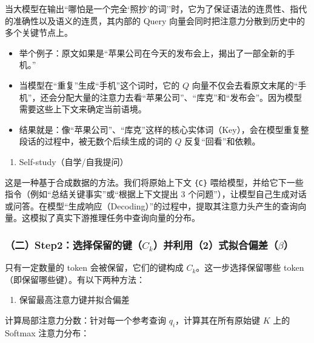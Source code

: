 当大模型在输出``哪怕是一个完全`照抄'的词''时，它为了保证语法的连贯性、指代的准确性以及语义的连贯，其内部的 Query 向量会同时把注意力分散到历史中的多个关键节点上。

\begin{itemize}
\tightlist
\item
  举个例子：原文如果是``苹果公司在今天的发布会上，揭出了一部全新的手机。''
\item
  当模型在``重复''生成``手机''这个词时，它的 \(Q\) 向量不仅会去看原文末尾的``手机''，还会分配大量的注意力去看``苹果公司''、``库克''和``发布会''。因为模型需要这些上下文来确定当前语境。
\item
  结果就是：像``苹果公司''、``库克''这样的核心实体词（Key），会在模型重复整段话的过程中，被无数个后续生成的词的 \(Q\) 反复``回看''和依赖。
\end{itemize}

\begin{enumerate}
\def\labelenumi{\arabic{enumi}.}
\setcounter{enumi}{1}
\tightlist
\item
  Self-study（自学/自我提问）
\end{enumerate}

这是一种基于合成数据的方法。我们将原始上下文 \texttt{\{C\}} 喂给模型，并给它下一些指令（例如``总结关键事实''或``根据上下文提出 3 个问题''），让模型自己生成对话或问答。在模型``生成响应（Decoding）''的过程中，提取其注意力头产生的查询向量。这模拟了真实下游推理任务中查询向量的分布。

\hypertarget{ux4e8cstep2ux9009ux62e9ux4fddux7559ux7684ux952ec_kux5e76ux5229ux75282ux5f0fux62dfux5408ux504fux5deebeta}{%
\subsubsection{\texorpdfstring{（二）Step2：选择保留的键（\(C_k\)）并利用（2）式拟合偏差（\(\beta\)）}{（二）Step2：选择保留的键（C\_k）并利用（2）式拟合偏差（\textbackslash beta）}}\label{ux4e8cstep2ux9009ux62e9ux4fddux7559ux7684ux952ec_kux5e76ux5229ux75282ux5f0fux62dfux5408ux504fux5deebeta}}

只有一定数量的 token 会被保留，它们的键构成 \(C_k\)。这一步选择保留哪些 token（即保留哪些键）。有以下两种方法：

\begin{enumerate}
\def\labelenumi{\arabic{enumi}.}
\tightlist
\item
  保留最高注意力键并拟合偏差
\end{enumerate}

计算局部注意力分数：针对每一个参考查询 \(q_i\)，计算其在所有原始键 \(K\) 上的 Softmax 注意力分布：

